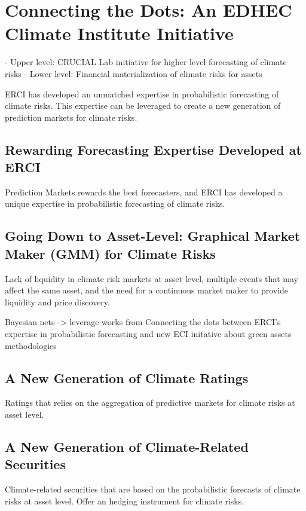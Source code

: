 \section{Connecting the Dots: An EDHEC Climate Institute Initiative}

- Upper level: CRUCIAL Lab initiative for higher level forecasting of climate risks
- Lower level: Financial materialization of climate risks for assets

ERCI has developed an unmatched expertise in probabilistic forecasting of climate risks.
This expertise can be leveraged to create a new generation of prediction markets for climate risks.

\subsection{Rewarding Forecasting Expertise Developed at ERCI}

Prediction Markets rewards the best forecasters, and ERCI has developed a
unique expertise in probabilistic forecasting of climate risks.

\subsection{Going Down to Asset-Level: Graphical Market Maker (GMM) for Climate Risks}

Lack of liquidity in climate risk markets at asset level, multiple events that
may affect the same asset, and the need for a continuous market maker to provide
liquidity and price discovery.

Bayesian nets -> leverage works from
Connecting the dots between ERCI's expertise in probabilistic forecasting and
new ECI initative about green assets methodologies

\subsection{A New Generation of Climate Ratings}

Ratings that relies on the aggregation of predictive markets for climate risks
at asset level.

\subsection{A New Generation of Climate-Related Securities}

Climate-related securities that are based on the probabilistic forecasts of
climate risks at asset level. Offer an hedging instrument for climate risks.
